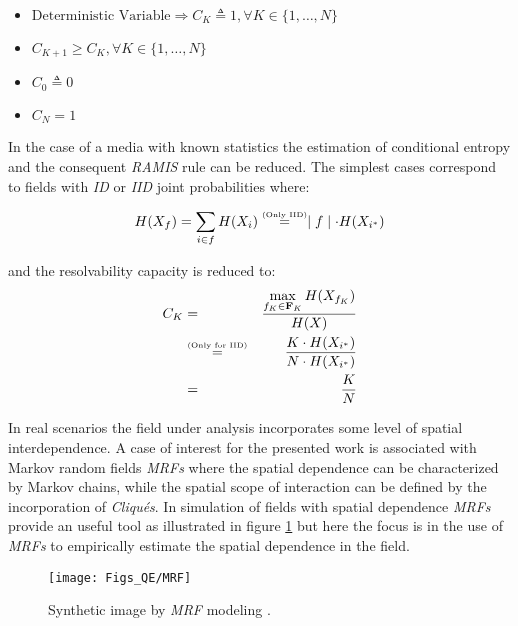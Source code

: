 	\begin{itemize}
	\item $\text{Deterministic Variable} \Rightarrow C_{K} \triangleq 1, \forall K \in \lbrace 1,\ldots, N \rbrace$
	\item $C_{K+1} \geq C_{K},  \forall K \in \lbrace 1,\ldots, N \rbrace$
	\item $C_0 \triangleq 0$
	\item $C_{N} = 1$
	\end{itemize}

In the case of a media with known statistics the estimation of conditional entropy and the consequent \emph{RAMIS} rule can be reduced. The simplest cases correspond to fields with \emph{ID} or \emph{IID} joint probabilities where:
	
	\begin{equation}
	\label{eq_OWP_ID_IID}
		H(X_f)  =  \displaystyle \sum_{i \in f}{H(X_{ i })} \stackrel{\text{\tiny (Only IID)}}{=}  \mid f \mid \cdot H( X_{ i^* }) 
	\end{equation}

and the resolvability capacity is reduced to:
	\begin{eqnarray}
	C_{K} & = & \displaystyle \frac{\displaystyle \max_{f_{K} \in \mathbf{F}_{K}} \displaystyle H(X_{f_{K}})}{\displaystyle H(X)} \nonumber\\
		& \stackrel{\text{\tiny (Only for IID)}}{=} & \displaystyle \frac{\displaystyle K \cdot  H(X_{ i^*})}{\displaystyle N \cdot H(X_{ i^* })}\nonumber\\
		& = & \displaystyle \frac{{K}}{N}\nonumber
	\end{eqnarray}		

In real scenarios the field under analysis incorporates some level of spatial interdependence. A case of interest for the presented work is associated with Markov random fields \emph{MRFs} where the spatial dependence can be characterized by Markov chains, while the spatial scope of interaction can be defined by the incorporation of \emph{Cliqués}. In simulation of fields with spatial dependence \emph{MRFs} provide an useful tool \citep{MRFTM} as illustrated in figure \ref{fig:MRF} but here the focus is in the use of \emph{MRFs} to empirically estimate the spatial dependence in the field.

	\begin{figure}[ht!]
    \centering
    \texttt{[image: Figs\_QE/MRF]}
	\caption[Synthetic image by \emph{MRF} modeling ]{\label{fig:MRF} Synthetic image by \emph{MRF} modeling  \citep{MRFTM}. }
 	\end{figure}
	
